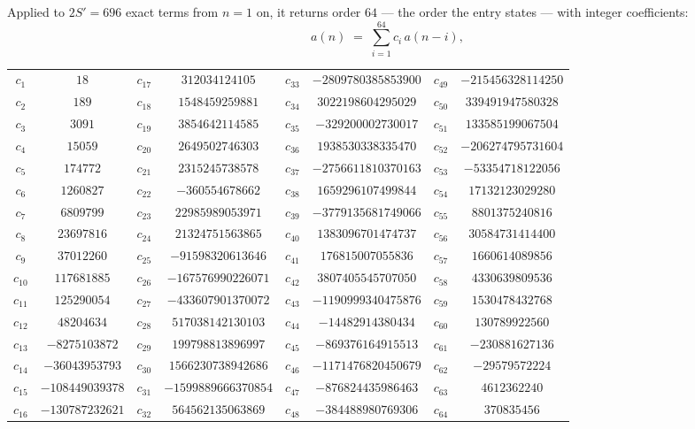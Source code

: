 \documentclass[11pt,a4paper]{article}
\theoremstyle{plain}
\theoremstyle{definition}
\begin{document}
Applied to $2S'=696$ exact terms from $n=1$ on, it returns order $64$ --- the
order the entry states --- with integer coefficients:
\[
a(n)\;=\;\sum_{i=1}^{64}c_i\,a(n-i),
\]
\begin{center}\small
\begin{tabular}{cccccccc}
$c_{1}$ & $18$ & $c_{17}$ & $312034124105$ & $c_{33}$ & $-2809780385853900$ & $c_{49}$ & $-215456328114250$ \\
$c_{2}$ & $189$ & $c_{18}$ & $1548459259881$ & $c_{34}$ & $3022198604295029$ & $c_{50}$ & $339491947580328$ \\
$c_{3}$ & $3091$ & $c_{19}$ & $3854642114585$ & $c_{35}$ & $-329200002730017$ & $c_{51}$ & $133585199067504$ \\
$c_{4}$ & $15059$ & $c_{20}$ & $2649502746303$ & $c_{36}$ & $1938530338335470$ & $c_{52}$ & $-206274795731604$ \\
$c_{5}$ & $174772$ & $c_{21}$ & $2315245738578$ & $c_{37}$ & $-2756611810370163$ & $c_{53}$ & $-53354718122056$ \\
$c_{6}$ & $1260827$ & $c_{22}$ & $-360554678662$ & $c_{38}$ & $1659296107499844$ & $c_{54}$ & $17132123029280$ \\
$c_{7}$ & $6809799$ & $c_{23}$ & $22985989053971$ & $c_{39}$ & $-3779135681749066$ & $c_{55}$ & $8801375240816$ \\
$c_{8}$ & $23697816$ & $c_{24}$ & $21324751563865$ & $c_{40}$ & $1383096701474737$ & $c_{56}$ & $30584731414400$ \\
$c_{9}$ & $37012260$ & $c_{25}$ & $-91598320613646$ & $c_{41}$ & $176815007055836$ & $c_{57}$ & $1660614089856$ \\
$c_{10}$ & $117681885$ & $c_{26}$ & $-167576990226071$ & $c_{42}$ & $3807405545707050$ & $c_{58}$ & $4330639809536$ \\
$c_{11}$ & $125290054$ & $c_{27}$ & $-433607901370072$ & $c_{43}$ & $-1190999340475876$ & $c_{59}$ & $1530478432768$ \\
$c_{12}$ & $48204634$ & $c_{28}$ & $517038142130103$ & $c_{44}$ & $-14482914380434$ & $c_{60}$ & $130789922560$ \\
$c_{13}$ & $-8275103872$ & $c_{29}$ & $199798813896997$ & $c_{45}$ & $-869376164915513$ & $c_{61}$ & $-230881627136$ \\
$c_{14}$ & $-36043953793$ & $c_{30}$ & $1566230738942686$ & $c_{46}$ & $-1171476820450679$ & $c_{62}$ & $-29579572224$ \\
$c_{15}$ & $-108449039378$ & $c_{31}$ & $-1599889666370854$ & $c_{47}$ & $-876824435986463$ & $c_{63}$ & $4612362240$ \\
$c_{16}$ & $-130787232621$ & $c_{32}$ & $564562135063869$ & $c_{48}$ & $-384488980769306$ & $c_{64}$ & $370835456$ \\
\end{tabular}
\end{center}
\end{document}
